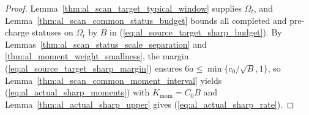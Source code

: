 \begin{proof}
    \leanok
    Lemma~\ref{thm:al_scan_target_typical_window} supplies $\Omega_t$, and
    Lemma~\ref{thm:al_scan_common_status_budget} bounds all completed and
    pre-charge statuses on $\Omega_t$ by $B$ in
    (\ref{eq:al_source_target_sharp_budget}). By
    Lemmas~\ref{thm:al_scan_status_scale_separation} and
    \ref{thm:al_moment_weight_smallness}, the margin
    (\ref{eq:al_source_target_sharp_margin}) ensures $6a\leq\min\{c_0/\sqrt B,1\}$,
    so Lemma~\ref{thm:al_scan_common_moment_interval} yields
    (\ref{eq:al_actual_sharp_moments}) with $K_{\mathrm{mom}}=C_0B$ and
    Lemma~\ref{thm:al_actual_sharp_upper} gives (\ref{eq:al_actual_sharp_rate}).
\end{proof}
